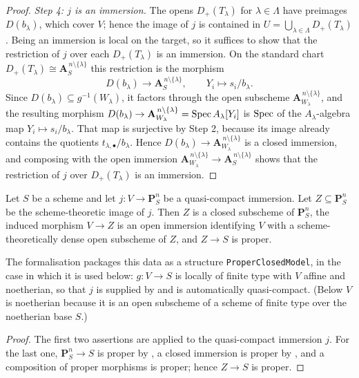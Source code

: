 \begin{proof}
\emph{Step 4: $j$ is an immersion.}  The opens $D_+(T_{\lambda})$ for
$\lambda\in\Lambda$ have preimages $D(b_\lambda)$, which cover $V$; hence the
image of $j$ is contained in $U=\bigcup_{\lambda\in\Lambda}D_+(T_\lambda)$.
Being an immersion is local on the target, so it suffices to show that the
restriction of $j$ over each $D_+(T_\lambda)$ is an immersion.  On the standard
chart $D_+(T_\lambda)\cong\mathbf A^{\,n\setminus\{\lambda\}}_S$ this
restriction is the morphism
\[
  D(b_\lambda)\longrightarrow\mathbf A^{\,n\setminus\{\lambda\}}_S,
  \qquad Y_i\longmapsto s_i/b_\lambda .
\]
Since $D(b_\lambda)\subseteq g^{-1}(W_\lambda)$, it factors through the open
subscheme $\mathbf A^{\,n\setminus\{\lambda\}}_{W_\lambda}$, and the resulting
morphism
$D(b_\lambda)\to\mathbf A^{\,n\setminus\{\lambda\}}_{W_\lambda}
=\operatorname{Spec} A_\lambda[Y_i]$ is $\operatorname{Spec}$ of the $A_\lambda$-algebra map
$Y_i\mapsto s_i/b_\lambda$.  That map is surjective by Step 2, because its
image already contains the quotients $t_{\lambda,\bullet}/b_\lambda$.  Hence
$D(b_\lambda)\to\mathbf A^{\,n\setminus\{\lambda\}}_{W_\lambda}$ is a closed
immersion, and composing with the open immersion
$\mathbf A^{\,n\setminus\{\lambda\}}_{W_\lambda}\to
\mathbf A^{\,n\setminus\{\lambda\}}_S$ shows that the restriction of $j$ over
$D_+(T_\lambda)$ is an immersion.
\end{proof}

\begin{lemma}\label{lem:chow-closed-model}
\leanok
Let $S$ be a scheme and let $j\colon V\to\mathbf P^n_S$ be a quasi-compact
immersion.  Let $Z\subseteq\mathbf P^n_S$ be the scheme-theoretic image of $j$.
Then $Z$ is a closed subscheme of $\mathbf P^n_S$, the induced morphism
$V\to Z$ is an open immersion identifying $V$ with a scheme-theoretically dense
open subscheme of $Z$, and $Z\to S$ is proper.

The formalisation packages this data as a structure
\texttt{ProperClosedModel}, in the case in which it is used below:
$g\colon V\to S$ is locally of finite type with $V$ affine and noetherian, so
that $j$ is supplied by  and is automatically
quasi-compact.  (Below $V$ is noetherian because it is an open subscheme of a
scheme of finite type over the noetherian base $S$.)
\end{lemma}
\begin{proof}
\leanok
The first two assertions are  applied to the quasi-compact
immersion $j$.  For the last one, $\mathbf P^n_S\to S$ is proper by
, a closed immersion is proper by , and
a composition of proper morphisms is proper; hence $Z\to S$ is proper.
\end{proof}

